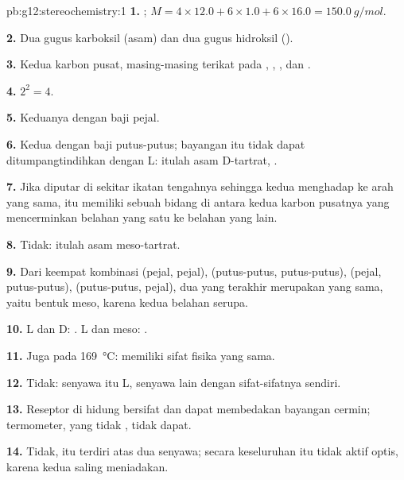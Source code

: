 \begin{solution}{pb:g12:stereochemistry:1}
\textbf{1.} ; $M = 4 \times 12.0 + 6 \times 1.0 + 6 \times 16.0
= \qty{150.0}{g/mol}$.

\textbf{2.} Dua gugus karboksil (asam) dan dua gugus hidroksil
().

\textbf{3.} Kedua karbon pusat, masing-masing terikat pada ,
, , dan .

\textbf{4.} $2^2 = 4$.

\textbf{5.} Keduanya dengan baji pejal.

\textbf{6.} Kedua  dengan baji putus-putus; bayangan itu tidak
dapat ditumpangtindihkan dengan L: itulah asam D-tartrat, .

\textbf{7.} Jika diputar di sekitar ikatan tengahnya sehingga kedua
 menghadap ke arah yang sama,  itu memiliki sebuah bidang
di antara kedua karbon pusatnya yang mencerminkan belahan yang satu ke
belahan yang lain.

\textbf{8.} Tidak: itulah asam meso-tartrat.

\textbf{9.} Dari keempat kombinasi (pejal, pejal), (putus-putus,
putus-putus), (pejal, putus-putus), (putus-putus, pejal), dua yang
terakhir merupakan  yang sama, yaitu bentuk meso, karena kedua
belahan  serupa.

\textbf{10.} L dan D: . L dan meso: .

\textbf{11.} Juga pada \qty{169}{\celsius}:  memiliki sifat
fisika yang sama.

\textbf{12.} Tidak: senyawa itu  L, senyawa lain dengan
sifat-sifatnya sendiri.

\textbf{13.} Reseptor di hidung bersifat  dan dapat membedakan
bayangan cermin; termometer, yang tidak , tidak dapat.

\textbf{14.} Tidak,  itu terdiri atas dua senyawa; secara
keseluruhan  itu tidak aktif optis, karena kedua 
saling meniadakan.


\end{solution}
